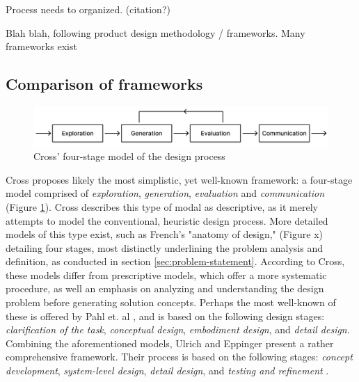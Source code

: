 Process needs to organized. (citation?)

Blah blah, following product design methodology / frameworks. Many frameworks exist

\subsection{Comparison of frameworks}
\vspace{2em}
\begin{figure}[H]
  \centering
  \includegraphics[width=14cm]{Pictures/Figures/cross.png}
  \caption{Cross' four-stage model of the design process}
  \label{fig:cross}
\end{figure}

Cross \cite{cross} proposes likely the most simplistic, yet well-known framework: a four-stage model comprised of \textit{exploration}, \textit{generation}, \textit{evaluation} and \textit{communication} (Figure \ref{fig:cross}). Cross describes this type of modal as descriptive, as it merely attempts to model the conventional, heuristic design process. More detailed models of this type exist, such as French's \cite{french} "anatomy of design," (Figure x) detailing four stages, most distinctly underlining the problem analysis and definition, as conducted in section \ref{sec:problem-statement}. According to Cross, these models differ from prescriptive models, which offer a more systematic procedure, as well an emphasis on analyzing and understanding the design problem before generating solution concepts. Perhaps the most well-known of these is offered by Pahl et. al \cite{pahl_beitz}, and is based on the following design stages: \textit{clarification of the task}, \textit{conceptual design}, \textit{embodiment design}, and \textit{detail design}. Combining the aforementioned models, Ulrich and Eppinger present a rather comprehensive framework. Their process is based on the following stages: \textit{concept development}, \textit{system-level design}, \textit{detail design}, and \textit{testing and refinement} \cite{ulrich_eppinger}.


